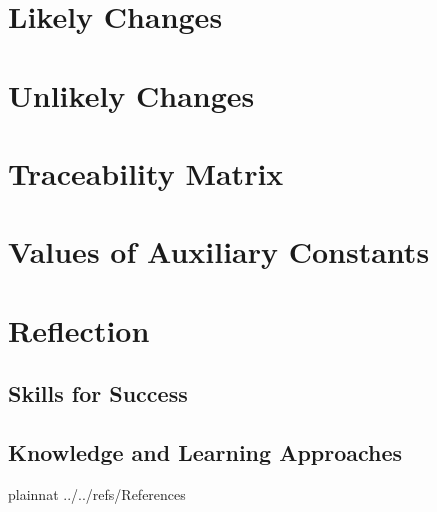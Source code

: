 \documentclass[12pt]{article}
\begin{document}
\section{Likely Changes}
\section{Unlikely Changes}

\section{Traceability Matrix}

\appendix
\section{Values of Auxiliary Constants}

\newpage

\appendix
\section{Reflection}
\subsection{Skills for Success}
\subsection{Knowledge and Learning Approaches}

\newpage

 {plainnat}
 {../../refs/References}
\end{document}
